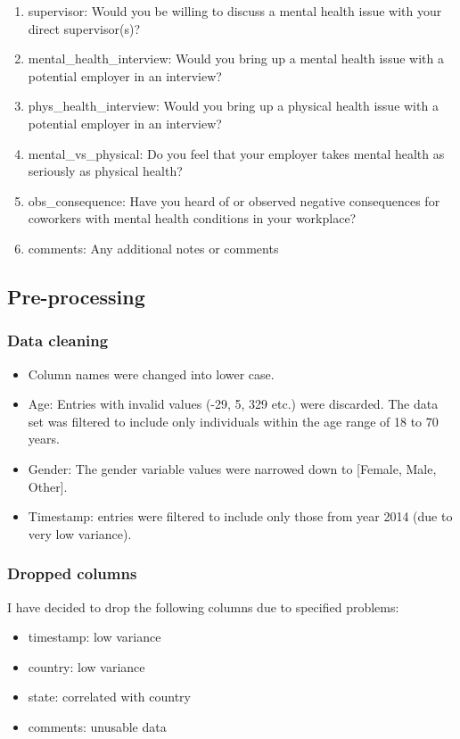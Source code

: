 \documentclass[conference]{IEEEtran}
\begin{document}
\begin{enumerate}
    \item supervisor: Would you be willing to discuss a mental health issue with your direct supervisor(s)?
    \item mental\_health\_interview: Would you bring up a mental health issue with a potential employer in an interview?
    \item phys\_health\_interview: Would you bring up a physical health issue with a potential employer in an interview?
    \item mental\_vs\_physical: Do you feel that your employer takes mental health as seriously as physical health?
    \item obs\_consequence: Have you heard of or observed negative consequences for coworkers with mental health conditions in your workplace?
    \item comments: Any additional notes or comments
\end{enumerate}

\subsection{Pre-processing}

\subsubsection{Data cleaning}
\begin{itemize}
    \item Column names were changed into lower case.
    \item Age: Entries with invalid values (-29, 5, 329 etc.) were discarded. The data set was filtered to include only individuals within the age range of 18 to 70 years.
    \item Gender: The gender variable values were narrowed down to [Female, Male, Other].
    \item Timestamp: entries were filtered to include only those from year 2014 (due to very low variance).
\end{itemize}

\subsubsection{Dropped columns}
I have decided to drop the following columns due to specified problems:
\begin{itemize}
    \item timestamp: low variance
    \item country: low variance
    \item state: correlated with country
    \item comments: unusable data
\end{itemize}
\end{document}
